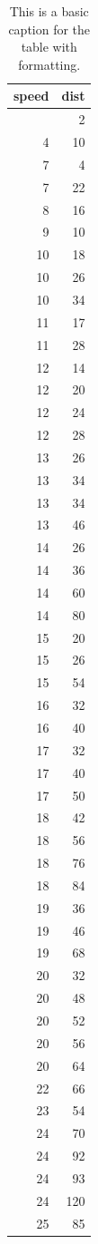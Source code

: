 \documentclass[
  letterpaper,
]{article}
\begin{document}
\begingroup

\begin{longtable}{rr}

\caption{\label{tbl-format-gt}This is a basic caption for the table with
formatting.}

\tabularnewline

\toprule
{\bfseries speed} & {\bfseries dist} \\ 
\midrule\endhead\addlinespace[2.5pt]
4 & 2 \\ 
4 & 10 \\ 
7 & 4 \\ 
7 & 22 \\ 
8 & 16 \\ 
9 & 10 \\ 
10 & 18 \\ 
10 & 26 \\ 
10 & 34 \\ 
11 & 17 \\ 
11 & 28 \\ 
12 & 14 \\ 
12 & 20 \\ 
12 & 24 \\ 
12 & 28 \\ 
13 & 26 \\ 
13 & 34 \\ 
13 & 34 \\ 
13 & 46 \\ 
14 & 26 \\ 
14 & 36 \\ 
14 & 60 \\ 
14 & 80 \\ 
15 & 20 \\ 
15 & 26 \\ 
15 & 54 \\ 
16 & 32 \\ 
16 & 40 \\ 
17 & 32 \\ 
17 & 40 \\ 
17 & 50 \\ 
18 & 42 \\ 
18 & 56 \\ 
18 & 76 \\ 
18 & 84 \\ 
19 & 36 \\ 
19 & 46 \\ 
19 & 68 \\ 
20 & 32 \\ 
20 & 48 \\ 
20 & 52 \\ 
20 & 56 \\ 
20 & 64 \\ 
22 & 66 \\ 
23 & 54 \\ 
24 & 70 \\ 
24 & 92 \\ 
24 & 93 \\ 
24 & 120 \\ 
25 & 85 \\ 
\bottomrule

\end{longtable}
\end{document}
